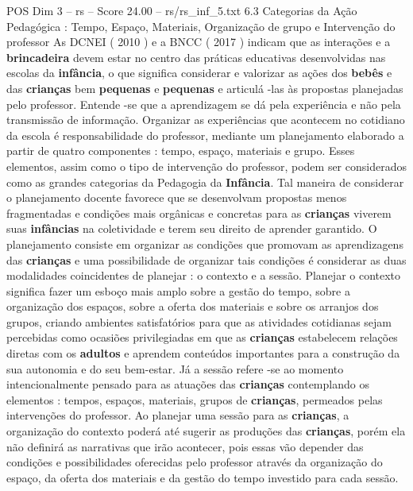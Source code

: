 \begin{textsample}{POS Dim 3 – rs – Score 24.00 – rs/rs\_inf\_5.txt}  \label{ex:f3_pos_243}
6.3 Categorias da Ação Pedagógica : Tempo, Espaço, Materiais, Organização de grupo e Intervenção do professor As DCNEI ( 2010 ) e a BNCC ( 2017 ) indicam que as interações e a \textbf{brincadeira} devem estar no centro das práticas educativas desenvolvidas nas escolas da \textbf{infância}, o que significa considerar e valorizar as ações dos \textbf{bebês} e das \textbf{crianças} bem \textbf{pequenas} e \textbf{pequenas} e articulá -las às propostas planejadas pelo professor.
Entende -se que a aprendizagem se dá pela experiência e não pela transmissão de informação.
Organizar as experiências que acontecem no cotidiano da escola é responsabilidade do professor, mediante um planejamento elaborado a partir de quatro componentes : tempo, espaço, materiais e grupo.
Esses elementos, assim como o tipo de intervenção do professor, podem ser considerados como as grandes categorias da Pedagogia da \textbf{Infância}.
Tal maneira de considerar o planejamento docente favorece que se desenvolvam propostas menos fragmentadas e condições mais orgânicas e concretas para as \textbf{crianças} viverem suas \textbf{infâncias} na coletividade e terem seu direito de aprender garantido.
O planejamento consiste em organizar as condições que promovam as aprendizagens das \textbf{crianças} e uma possibilidade de organizar tais condições é considerar as duas modalidades coincidentes de planejar : o contexto e a sessão.
Planejar o contexto significa fazer um esboço mais amplo sobre a gestão do tempo, sobre a organização dos espaços, sobre a oferta dos materiais e sobre os arranjos dos grupos, criando ambientes satisfatórios para que as atividades cotidianas sejam percebidas como ocasiões privilegiadas em que as \textbf{crianças} estabelecem relações diretas com os \textbf{adultos} e aprendem conteúdos importantes para a construção da sua autonomia e do seu bem-estar.
Já a sessão refere -se ao momento intencionalmente pensado para as atuações das \textbf{crianças} contemplando os elementos : tempos, espaços, materiais, grupos de \textbf{crianças}, permeados pelas intervenções do professor.
Ao planejar uma sessão para as \textbf{crianças}, a organização do contexto poderá até sugerir as produções das \textbf{crianças}, porém ela não definirá as narrativas que irão acontecer, pois essas vão depender das condições e possibilidades oferecidas pelo professor através da organização do espaço, da oferta dos materiais e da gestão do tempo investido para cada sessão.

\end{textsample}
